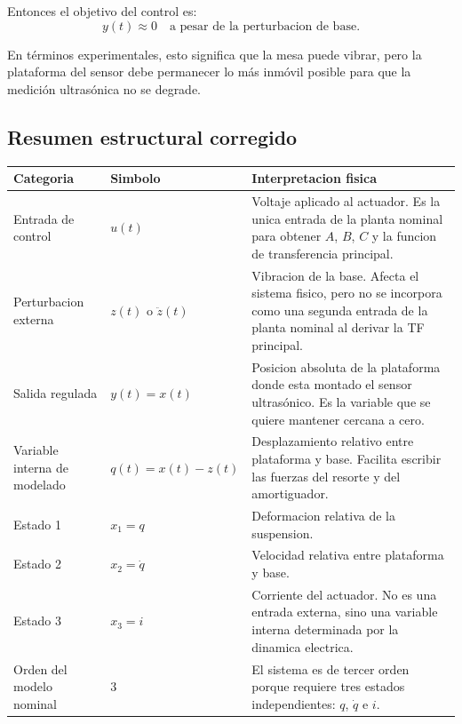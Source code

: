 \documentclass[11pt]{article}
\begin{document}
Entonces el objetivo del control es:
\begin{equation}
y(t)\approx 0 \quad \text{a pesar de la perturbacion de base}.
\end{equation}

En t\'erminos experimentales, esto significa que la mesa puede vibrar, pero la plataforma del sensor debe permanecer lo m\'as inm\'ovil posible para que la medici\'on ultras\'onica no se degrade.

\subsection{Resumen estructural corregido}

\begin{center}
\small
\begin{tabular}{>{\raggedright\arraybackslash}p{3.2cm} >{\raggedright\arraybackslash}p{2.8cm} >{\raggedright\arraybackslash}p{7.4cm}}
\toprule
\textbf{Categoria} & \textbf{Simbolo} & \textbf{Interpretacion fisica} \\
\midrule
Entrada de control & $u(t)$ & Voltaje aplicado al actuador. Es la unica entrada de la planta nominal para obtener $A$, $B$, $C$ y la funcion de transferencia principal. \\
Perturbacion externa & $z(t)$ o $\ddot z(t)$ & Vibracion de la base. Afecta el sistema fisico, pero no se incorpora como una segunda entrada de la planta nominal al derivar la TF principal. \\
Salida regulada & $y(t)=x(t)$ & Posicion absoluta de la plataforma donde esta montado el sensor ultras\'onico. Es la variable que se quiere mantener cercana a cero. \\
Variable interna de modelado & $q(t)=x(t)-z(t)$ & Desplazamiento relativo entre plataforma y base. Facilita escribir las fuerzas del resorte y del amortiguador. \\
Estado 1 & $x_1=q$ & Deformacion relativa de la suspension. \\
Estado 2 & $x_2=\dot q$ & Velocidad relativa entre plataforma y base. \\
Estado 3 & $x_3=i$ & Corriente del actuador. No es una entrada externa, sino una variable interna determinada por la dinamica electrica. \\
Orden del modelo nominal & $3$ & El sistema es de tercer orden porque requiere tres estados independientes: $q$, $\dot q$ e $i$. \\
\bottomrule
\end{tabular}
\end{center}
\end{document}
